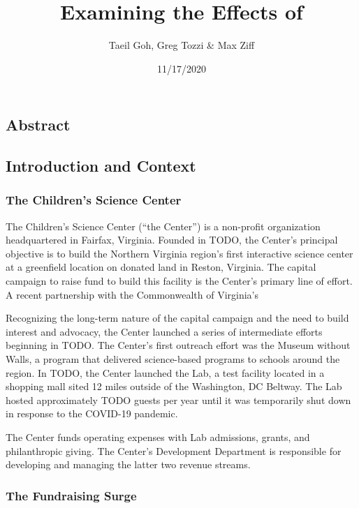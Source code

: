 \documentclass[]{article}
\title{Examining the Effects of}
\author{Taeil Goh, Greg Tozzi \& Max Ziff}
\date{11/17/2020}
\begin{document}
\maketitle

\subsection{Abstract}\label{abstract}

\subsection{Introduction and Context}\label{introduction-and-context}

\subsubsection{The Children's Science
Center}\label{the-childrens-science-center}

The Children's Science Center (``the Center'') is a non-profit
organization headquartered in Fairfax, Virginia. Founded in TODO, the
Center's principal objective is to build the Northern Virginia region's
first interactive science center at a greenfield location on donated
land in Reston, Virginia. The capital campaign to raise fund to build
this facility is the Center's primary line of effort. A recent
partnership with the Commonwealth of Virginia's

Recognizing the long-term nature of the capital campaign and the need to
build interest and advocacy, the Center launched a series of
intermediate efforts beginning in TODO. The Center's first outreach
effort was the Museum without Walls, a program that delivered
science-based programs to schools around the region. In TODO, the Center
launched the Lab, a test facility located in a shopping mall sited 12
miles outside of the Washington, DC Beltway. The Lab hosted
approximately TODO guests per year until it was temporarily shut down in
response to the COVID-19 pandemic.

The Center funds operating expenses with Lab admissions, grants, and
philanthropic giving. The Center's Development Department is responsible
for developing and managing the latter two revenue streams.

\subsubsection{The Fundraising Surge}\label{the-fundraising-surge}
\end{document}
